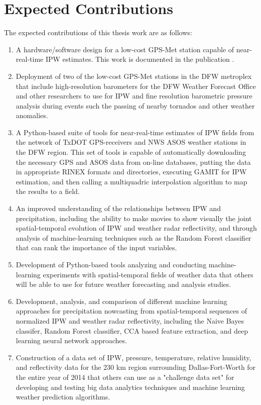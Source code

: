 \documentclass[proposal]{umassthesis}
\begin{document}
\section{Expected Contributions}

The expected contributions of this thesis work are as follows: 

\begin{enumerate}
\item A hardware/software design for a low-cost GPS-Met station capable of near-real-time IPW estimates. This work is documented in the publication \cite{nagarajan2015lowcost}.
\item Deployment of two of the low-cost GPS-Met stations in the DFW metroplex that include high-resolution barometers for the DFW Weather Forecast Office and other researchers to use for IPW and fine resolution barometric pressure analysis during events such the passing of nearby tornados and other weather anomalies. 
\item A Python-based suite of tools for near-real-time estimates of IPW fields from the network of TxDOT GPS-receivers and NWS ASOS weather stations in the DFW region. This set of tools is capable of automatically downloading the necessary GPS and ASOS data from on-line databases, putting the data in appropriate RINEX formats and directories, executing GAMIT for IPW estimation, and then calling a multiquadric interpolation algorithm to map the results to a field.
\item An improved understanding of the relationships between IPW and precipitation, including the ability to make movies to show visually the joint spatial-temporal evolution of IPW and weather radar reflectivity, and through analysis of machine-learning techniques such as the Random Forest classifier that can rank the importance of the input variables.
\item Development of Python-based tools analyzing and conducting machine-learning experiments with spatial-temporal fields of weather data that others will be able to use for future weather forecasting and analysis studies.
\item Development, analysis, and comparison of different machine learning approaches for precipitation nowcasting from spatial-temporal sequences of normalized IPW and weather radar reflectivity, including the Naive Bayes classifer, Random Forest classifier, CCA based feature extraction, and deep learning neural network approaches.
\item Construction of a data set of IPW, pressure, temperature, relative humidity, and reflectivity data for the 230 km region surrounding Dallas-Fort-Worth for the entire year of 2014 that others can use as a "challenge data set" for developing and testing big data analytics techniques and machine learning weather prediction algorithms.
\end{enumerate}
\end{document}

